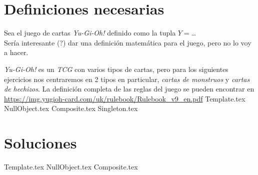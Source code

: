 \section{Definiciones necesarias}
  Sea el juego de cartas \textit{Yu-Gi-Oh!} definido como la tupla 
  $Y = $\dots\\
  Sería interesante (?) dar una definición matemática para el juego, pero no lo voy a 
  hacer.

  \textit{Yu-Gi-Oh!} es un \textit{TCG} con varios tipos de cartas, pero para los 
  siguientes ejercicios nos centraremos en 2 tipos en particular, \textit{cartas de 
  monstruos} y \textit{cartas de hechizos}.
  La definición completa de las reglas del juego se pueden encontrar en 
  \url{https://img.yugioh-card.com/uk/rulebook/Rulebook_v9_en.pdf}
%
{Template.tex} 
{NullObject.tex}
{Composite.tex}
{Singleton.tex}

\pagebreak
\section{Soluciones}
  {Template.tex}
  {NullObject.tex}
  {Composite.tex}
%